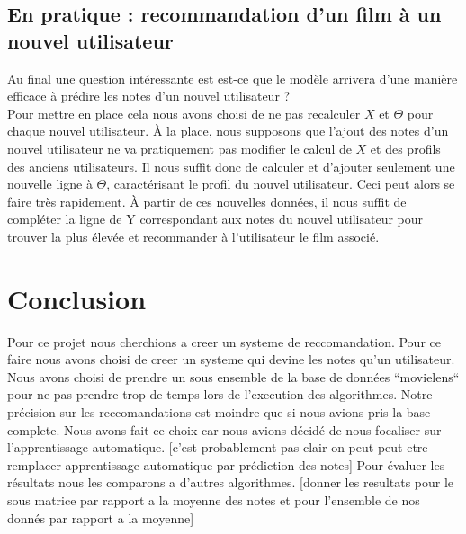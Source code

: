 \documentclass[a4paper,10pt]{article}
\begin{document}
\subsection{En pratique : recommandation d'un film à un nouvel utilisateur}

Au final une question intéressante est est-ce que le modèle arrivera d'une manière efficace à prédire les notes d'un nouvel utilisateur ?\\

Pour mettre en place cela nous avons choisi de ne pas recalculer $X$ et $\Theta$ pour chaque nouvel utilisateur. À la place, nous supposons que l'ajout des notes d'un nouvel utilisateur ne va pratiquement pas modifier le calcul de $X$ et des profils des anciens utilisateurs. Il nous suffit donc de calculer et d'ajouter seulement une nouvelle ligne à $\Theta$, caractérisant le profil du nouvel utilisateur. Ceci peut alors se faire très rapidement. À partir de ces nouvelles données, il nous suffit de compléter la ligne de Y correspondant aux notes du nouvel utilisateur pour trouver la plus élevée et recommander à l'utilisateur le film associé.

\section*{Conclusion}

Pour ce projet nous cherchions a creer un systeme de reccomandation. Pour ce faire nous avons choisi de
creer un systeme qui devine les notes qu'un utilisateur.%
Nous avons %
choisi de prendre un sous ensemble de la base de données ``movielens``
pour ne pas prendre trop de temps lors de l'execution des algorithmes. %
Notre précision sur les reccomandations est moindre que si nous avions pris la
base complete. Nous avons fait ce choix car nous avions décidé de nous 
focaliser sur l'apprentissage automatique. [c'est probablement pas clair on peut peut-etre remplacer apprentissage automatique par prédiction des notes]
Pour évaluer les résultats nous les comparons a d'autres algorithmes.
[donner les resultats pour le sous matrice par rapport a la moyenne des notes et pour l'ensemble de nos donnés par rapport a la moyenne]%
\end{document}
